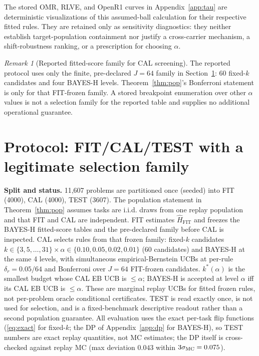 \documentclass{article}
\theoremstyle{definition}
\theoremstyle{remark}
\newtheorem{remark}{Remark}
\begin{document}
The stored OMR, RLVE, and OpenR1 curves in Appendix~\ref{app:tau} are
deterministic visualizations of this assumed-ball calculation for their
respective fitted rules. They are retained only as sensitivity diagnostics:
they neither establish target-population containment nor justify a
cross-carrier mechanism, a shift-robustness ranking, or a prescription for
choosing $\alpha$.

\begin{remark}[Reported fitted-score family for CAL screening]
\label{rem:nested}
The reported protocol uses only the finite, pre-declared $J=64$ family in
Section~\ref{sec:protocol}: 60 fixed-$k$ candidates and four BAYES-H levels.
Theorem~\ref{thm:pop}'s Bonferroni statement is only for that FIT-frozen
family. A stored breakpoint enumeration over other $\alpha$ values is not a
selection family for the reported table and supplies no additional operational
guarantee.
\end{remark}

\section{Protocol: FIT/CAL/TEST with a legitimate selection family}
\label{sec:protocol}

\textbf{Split and status.} 11{,}607 problems are partitioned once (seeded)
into FIT (4000), CAL (4000), TEST (3607). The population statement in
Theorem~\ref{thm:pop} assumes tasks are i.i.d. draws from one replay
population and that FIT and CAL are independent. FIT estimates
$\widehat H_{\mathrm{FIT}}$ and freezes the BAYES-H fitted-score tables and
the pre-declared family before CAL is inspected. CAL selects rules from that
frozen family:
fixed-$k$ candidates $k\in\{3,5,\dots,31\}\times\alpha\in\{0.10,0.05,0.02,
0.01\}$ (60 candidates) and BAYES-H at the same 4 levels, with simultaneous
empirical-Bernstein UCBs at per-rule $\delta_r=0.05/64$ and Bonferroni over
$J=64$ FIT-frozen candidates. $k^*(\alpha)$ is the smallest budget whose CAL
EB UCB is $\le\alpha$; BAYES-H is accepted at level $\alpha$ iff its CAL EB
UCB is $\le\alpha$. These are marginal replay UCBs for fitted frozen rules,
not per-problem oracle conditional certificates. TEST is read exactly once, is not
used for selection, and is a fixed-benchmark descriptive readout rather than
a second population guarantee. All evaluation uses the exact per-task flip
functions (\eqref{eq:exact} for
fixed-$k$; the DP of Appendix~\ref{app:dp} for BAYES-H), so TEST numbers are
exact replay quantities, not MC estimates; the DP itself is cross-checked
against replay MC (max deviation $0.043$ within $3\sigma_{\rm MC}=0.075$).
\end{document}
